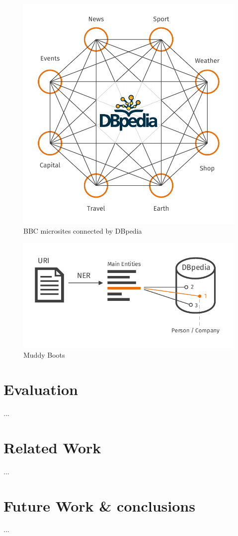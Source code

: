 \documentclass{llncs}
\begin{document}
\begin{figure}[!h]
  \centering
  \includegraphics[width=.75\textwidth]{images/dbpedia_dark}
  \caption{BBC microsites connected by DBpedia}
  \label{fig:dbpedia}
\end{figure}
%
\begin{figure}[!h]
  \includegraphics[width=\textwidth]{images/muddy_boots_dark}
  \caption{Muddy Boots}
  \label{fig:muddy}
\end{figure}
%
\section{Evaluation}
%
...
%
\section{Related Work}
%
...
%
\section{Future Work \& conclusions}
%
...
\end{document}
